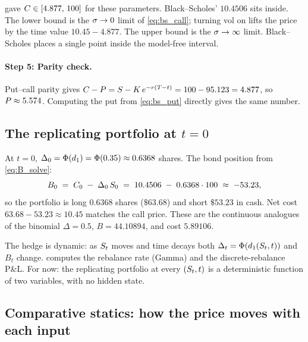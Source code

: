 \begin{example}
 gave $C \in [4.877,\, 100]$ for
these parameters. Black--Scholes' $10.4506$ sits inside. The
lower bound is the $\sigma \to 0$ limit of \eqref{eq:bs_call};
turning vol on lifts the price by the time value
$10.45 - 4.877$. The upper bound is the $\sigma \to \infty$
limit. Black--Scholes places a single point inside the
model-free interval.
\end{example}

\paragraph{Step 5: Parity check.}
Put--call parity gives $C - P = S -
K\,e^{-r(T - t)} = 100 - 95.123 = 4.877$, so
$P \approx 5.574$. Computing the put from \eqref{eq:bs_put}
directly gives the same number.

\subsection{The replicating portfolio at $t = 0$}
\label{subsec:ch15_replicating_continuous}

At $t = 0$, $\Delta_0 = \Phi(d_1) = \Phi(0.35) \approx 0.6368$
shares. The bond position from \eqref{eq:B_solve}:
\begin{equation*}
  B_0 \;=\; C_0 \;-\; \Delta_0\,S_0
       \;=\; 10.4506 \;-\; 0.6368 \cdot 100
       \;\approx\; -53.23,
\end{equation*}
so the portfolio is long $0.6368$ shares ($\$63.68$) and short
$\$53.23$ in cash. Net cost $63.68 - 53.23 \approx 10.45$
matches the call price. These are the continuous analogues of
the binomial $\Delta = 0.5$, $B = 44.10894$, and cost $5.89106$.

The hedge is dynamic: as $S_t$ moves and time decays both
$\Delta_t = \Phi(d_1(S_t, t))$ and $B_t$ change.
 computes the rebalance rate (Gamma) and
the discrete-rebalance P\&L. For now: the replicating portfolio
at every $(S_t, t)$ is a deterministic function of two
variables, with no hidden state.

\subsection{Comparative statics: how the price moves with each input}
\label{subsec:ch15_comparative}

